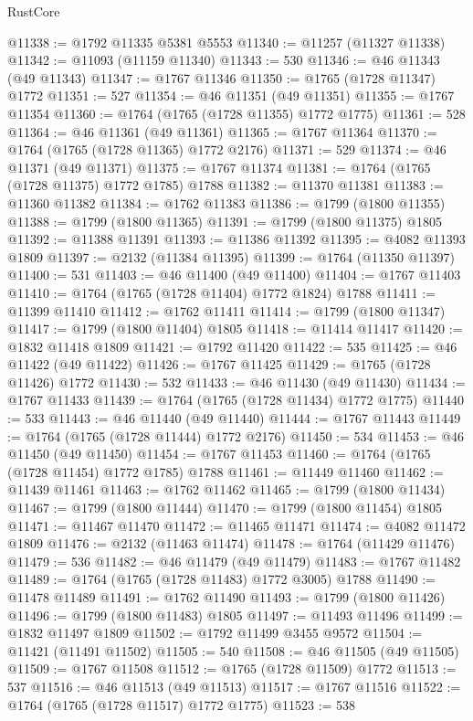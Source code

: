 \begin{lexlean}{RustCore}
\begin{coremodule}
@11338 := @1792 @11335 @5381 @5553
@11340 := @11257 (@11327 @11338)
@11342 := @11093 (@11159 @11340)
@11343 := 530
@11346 := @46 @11343 (@49 @11343)
@11347 := @1767 @11346
@11350 := @1765 (@1728 @11347) @1772
@11351 := 527
@11354 := @46 @11351 (@49 @11351)
@11355 := @1767 @11354
@11360 := @1764 (@1765 (@1728 @11355) @1772 @1775)
@11361 := 528
@11364 := @46 @11361 (@49 @11361)
@11365 := @1767 @11364
@11370 := @1764 (@1765 (@1728 @11365) @1772 @2176)
@11371 := 529
@11374 := @46 @11371 (@49 @11371)
@11375 := @1767 @11374
@11381 := @1764 (@1765 (@1728 @11375) @1772 @1785) @1788
@11382 := @11370 @11381
@11383 := @11360 @11382
@11384 := @1762 @11383
@11386 := @1799 (@1800 @11355)
@11388 := @1799 (@1800 @11365)
@11391 := @1799 (@1800 @11375) @1805
@11392 := @11388 @11391
@11393 := @11386 @11392
@11395 := @4082 @11393 @1809
@11397 := @2132 (@11384 @11395)
@11399 := @1764 (@11350 @11397)
@11400 := 531
@11403 := @46 @11400 (@49 @11400)
@11404 := @1767 @11403
@11410 := @1764 (@1765 (@1728 @11404) @1772 @1824) @1788
@11411 := @11399 @11410
@11412 := @1762 @11411
@11414 := @1799 (@1800 @11347)
@11417 := @1799 (@1800 @11404) @1805
@11418 := @11414 @11417
@11420 := @1832 @11418 @1809
@11421 := @1792 @11420
@11422 := 535
@11425 := @46 @11422 (@49 @11422)
@11426 := @1767 @11425
@11429 := @1765 (@1728 @11426) @1772
@11430 := 532
@11433 := @46 @11430 (@49 @11430)
@11434 := @1767 @11433
@11439 := @1764 (@1765 (@1728 @11434) @1772 @1775)
@11440 := 533
@11443 := @46 @11440 (@49 @11440)
@11444 := @1767 @11443
@11449 := @1764 (@1765 (@1728 @11444) @1772 @2176)
@11450 := 534
@11453 := @46 @11450 (@49 @11450)
@11454 := @1767 @11453
@11460 := @1764 (@1765 (@1728 @11454) @1772 @1785) @1788
@11461 := @11449 @11460
@11462 := @11439 @11461
@11463 := @1762 @11462
@11465 := @1799 (@1800 @11434)
@11467 := @1799 (@1800 @11444)
@11470 := @1799 (@1800 @11454) @1805
@11471 := @11467 @11470
@11472 := @11465 @11471
@11474 := @4082 @11472 @1809
@11476 := @2132 (@11463 @11474)
@11478 := @1764 (@11429 @11476)
@11479 := 536
@11482 := @46 @11479 (@49 @11479)
@11483 := @1767 @11482
@11489 := @1764 (@1765 (@1728 @11483) @1772 @3005) @1788
@11490 := @11478 @11489
@11491 := @1762 @11490
@11493 := @1799 (@1800 @11426)
@11496 := @1799 (@1800 @11483) @1805
@11497 := @11493 @11496
@11499 := @1832 @11497 @1809
@11502 := @1792 @11499 @3455 @9572
@11504 := @11421 (@11491 @11502)
@11505 := 540
@11508 := @46 @11505 (@49 @11505)
@11509 := @1767 @11508
@11512 := @1765 (@1728 @11509) @1772
@11513 := 537
@11516 := @46 @11513 (@49 @11513)
@11517 := @1767 @11516
@11522 := @1764 (@1765 (@1728 @11517) @1772 @1775)
@11523 := 538

\end{coremodule}
\end{lexlean}
